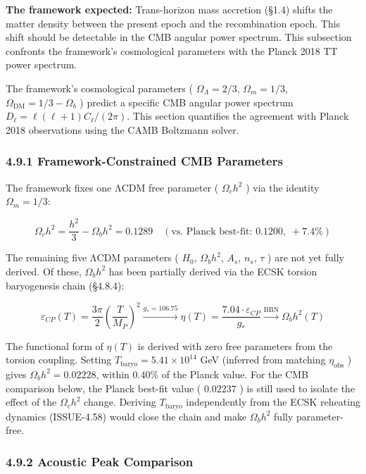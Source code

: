 \documentclass[11pt,a4paper]{article}
\theoremstyle{definition}\newtheorem{definition}{Definition}
\theoremstyle{remark}\newtheorem{remark}{Remark}
\begin{document}
\textbf{The framework expected:} Trans-horizon mass accretion (§1.4) shifts the matter density between the present epoch and the recombination epoch. This shift should be detectable in the CMB angular power spectrum. This subsection confronts the framework's cosmological parameters with the Planck 2018 TT power spectrum.

The framework's cosmological parameters ( $\Omega_\Lambda = 2/3$, $\Omega_m = 1/3$, $\Omega_{\text{DM}} = 1/3 - \Omega_b$ ) predict a specific CMB angular power spectrum $D_\ell = \ell(\ell+1)C_\ell / (2\pi)$. This section quantifies the agreement with Planck 2018 observations using the CAMB Boltzmann solver.
\subsubsection{4.9.1 Framework-Constrained CMB Parameters}

The framework fixes one ΛCDM free parameter ( $\Omega_c h^2$ ) via the identity $\Omega_m = 1/3$:


\begin{equation}
\Omega_c h^2 = \frac{h^2}{3} - \Omega_b h^2 = 0.1289 \quad (\text{vs. Planck best-fit: } 0.1200, \; +7.4\%)
\end{equation}


The remaining five ΛCDM parameters ( $H_0$, $\Omega_b h^2$, $A_s$, $n_s$, $\tau$ ) are not yet fully derived. Of these, $\Omega_b h^2$ has been partially derived via the ECSK torsion baryogenesis chain (§4.8.4):


\begin{equation}
\varepsilon_{CP}(T) = \frac{3\pi}{2}\left(\frac{T}{M_P}\right)^2 \xrightarrow{g_* = 106.75} \eta(T) = \frac{7.04 \cdot \varepsilon_{CP}}{g_*} \xrightarrow{\text{BBN}} \Omega_b h^2(T)
\end{equation}


The functional form of $\eta(T)$ is derived with zero free parameters from the torsion coupling. Setting $T_{\text{baryo}} = 5.41 \times 10^{14}$ GeV (inferred from matching $\eta_{\text{obs}}$ ) gives $\Omega_b h^2 = 0.02228$, within $0.40\%$ of the Planck value. For the CMB comparison below, the Planck best-fit value ( $0.02237$ ) is still used to isolate the effect of the $\Omega_c h^2$ change. Deriving $T_{\text{baryo}}$ independently from the ECSK reheating dynamics (ISSUE-4.58) would close the chain and make $\Omega_b h^2$ fully parameter-free.
\subsubsection{4.9.2 Acoustic Peak Comparison}
\end{document}
